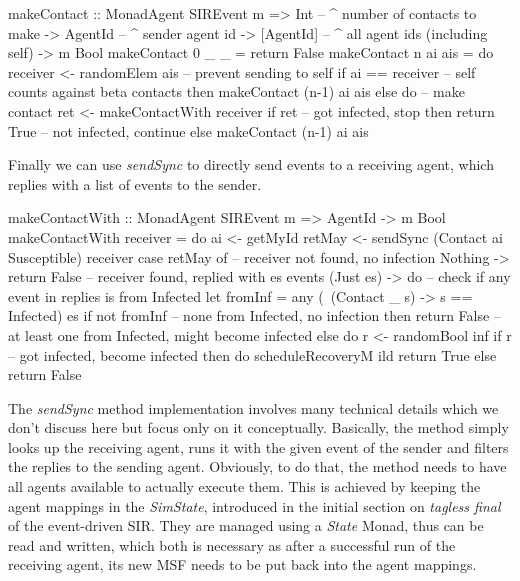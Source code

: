 \begin{HaskellCode}
makeContact :: MonadAgent SIREvent m 
            => Int       -- ^ number of contacts to make
            -> AgentId   -- ^ sender agent id
            -> [AgentId] -- ^ all agent ids (including self)
            -> m Bool
makeContact 0 _ _ = return False
makeContact n ai ais = do
  receiver <- randomElem ais
  -- prevent sending to self
  if ai == receiver
    -- self counts against beta contacts
    then makeContact (n-1) ai ais
    else do
      -- make contact
      ret <- makeContactWith receiver
      if ret
        -- got infected, stop
        then return True
        -- not infected, continue
        else makeContact (n-1) ai ais
\end{HaskellCode}

Finally we can use \textit{sendSync} to directly send events to a receiving agent, which replies with a list of events to the sender.

\begin{HaskellCode}
makeContactWith :: MonadAgent SIREvent m => AgentId -> m Bool
makeContactWith receiver = do
  ai     <- getMyId
  retMay <- sendSync (Contact ai Susceptible) receiver
  case retMay of 
    -- receiver not found, no infection
    Nothing -> return False
    -- receiver found, replied with es events
    (Just es) -> do
      -- check if any event in replies is from Infected
      let fromInf = any (\ (Contact _ s) -> s == Infected) es
      if not fromInf
        -- none from Infected, no infection
        then return False
        -- at least one from Infected, might become infected
        else do
          r <- randomBool inf
          if r 
            -- got infected, become infected
            then do
              scheduleRecoveryM ild
              return True
            else return False
\end{HaskellCode}

The \textit{sendSync} method implementation involves many technical details which we don't discuss here but focus only on it conceptually. Basically, the method simply looks up the receiving agent, runs it with the given event of the sender and filters the replies to the sending agent. Obviously, to do that, the method needs to have all agents available to actually execute them. This is achieved by keeping the agent mappings in the \textit{SimState}, introduced in the initial section on \textit{tagless final} of the event-driven SIR. They are managed using a \textit{State} Monad, thus can be read and written, which both is necessary as after a successful run of the receiving agent, its new MSF needs to be put back into the agent mappings.

